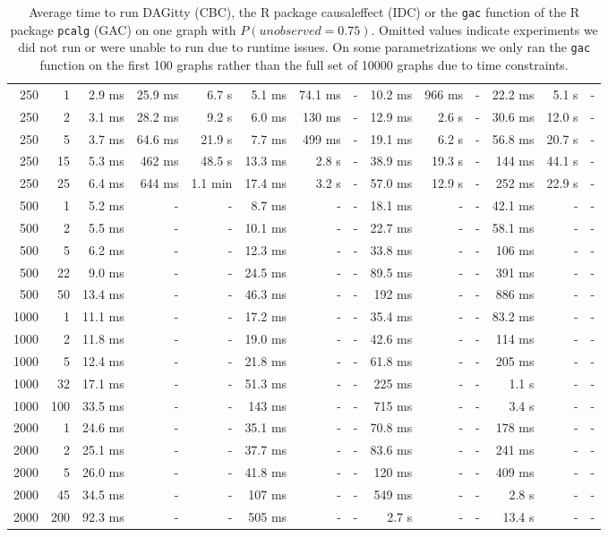 \begin{table}
\begin{center}
\begin{tabular}{|rr | rrr| rrr| rrr| rrr|}
\hline
250&1&
2.9 ms&25.9 ms&6.7 s&5.1 ms&74.1 ms&-&10.2 ms&966 ms&-&22.2 ms&5.1 s&-\\
250&2&
3.1 ms&28.2 ms&9.2 s&6.0 ms&130 ms&-&12.9 ms&2.6 s&-&30.6 ms&12.0 s&-\\
250&5&
3.7 ms&64.6 ms&21.9 s&7.7 ms&499 ms&-&19.1 ms&6.2 s&-&56.8 ms&20.7 s&-\\
250&15&
5.3 ms&462 ms&48.5 s&13.3 ms&2.8 s&-&38.9 ms&19.3 s&-&144 ms&44.1 s&-\\
250&25&
6.4 ms&644 ms&1.1 min&17.4 ms&3.2 s&-&57.0 ms&12.9 s&-&252 ms&22.9 s&-\\
\hline
500&1&
5.2 ms&-&-&8.7 ms&-&-&18.1 ms&-&-&42.1 ms&-&-\\
500&2&
5.5 ms&-&-&10.1 ms&-&-&22.7 ms&-&-&58.1 ms&-&-\\
500&5&
6.2 ms&-&-&12.3 ms&-&-&33.8 ms&-&-&106 ms&-&-\\
500&22&
9.0 ms&-&-&24.5 ms&-&-&89.5 ms&-&-&391 ms&-&-\\
500&50&
13.4 ms&-&-&46.3 ms&-&-&192 ms&-&-&886 ms&-&-\\
\hline
1000&1&
11.1 ms&-&-&17.2 ms&-&-&35.4 ms&-&-&83.2 ms&-&-\\
1000&2&
11.8 ms&-&-&19.0 ms&-&-&42.6 ms&-&-&114 ms&-&-\\
1000&5&
12.4 ms&-&-&21.8 ms&-&-&61.8 ms&-&-&205 ms&-&-\\
1000&32&
17.1 ms&-&-&51.3 ms&-&-&225 ms&-&-&1.1 s&-&-\\
1000&100&
33.5 ms&-&-&143 ms&-&-&715 ms&-&-&3.4 s&-&-\\
\hline
2000&1&
24.6 ms&-&-&35.1 ms&-&-&70.8 ms&-&-&178 ms&-&-\\
2000&2&
25.1 ms&-&-&37.7 ms&-&-&83.6 ms&-&-&241 ms&-&-\\
2000&5&
26.0 ms&-&-&41.8 ms&-&-&120 ms&-&-&409 ms&-&-\\
2000&45&
34.5 ms&-&-&107 ms&-&-&549 ms&-&-&2.8 s&-&-\\
2000&200&
92.3 ms&-&-&505 ms&-&-&2.7 s&-&-&13.4 s&-&-\\
\hline\end{tabular}
  \end{center}\vspace*{-3mm}
  \caption{Average time to run DAGitty (CBC), the R package {causaleffect}  (IDC) or the {\tt gac} function of the R package {\tt pcalg} (GAC) on one graph with $P(\textit{unobserved}=0.75)$.  Omitted values indicate experiments we did not run or were unable to run due to runtime issues. On some parametrizations we only ran the  {\tt gac} function on the first 100 graphs rather than the full set of 10000 graphs due to time constraints.
}\label{table:runtimes}
  \end{table}
